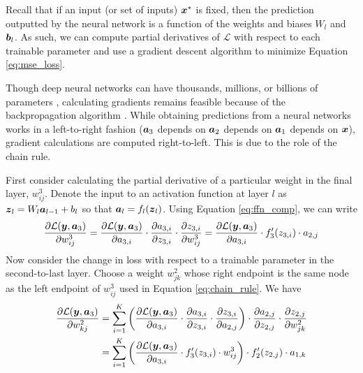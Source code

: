 Recall that if an input (or set of inputs) $\boldsymbol{x}^*$ is fixed, then the prediction outputted by the neural network is a function of the weights and biases $W_l$ and $\boldsymbol{b}_l$. As such, we can compute partial derivatives of $\mathcal{L}$ with respect to each trainable parameter and use a gradient descent algorithm to minimize Equation \ref{eq:mse_loss}.

Though deep neural networks can have thousands, millions, or billions of parameters \cite{gpt3}, calculating gradients remains feasible because of the backpropagation algorithm \cite{rojas1996}. While obtaining predictions from a neural networks works in a left-to-right fashion ($\boldsymbol{a}_3$ depends on $\boldsymbol{a}_2$ depends on $\boldsymbol{a}_1$ depends on $\boldsymbol{x}$), gradient calculations are computed right-to-left. This is due to the role of the chain rule.

First consider calculating the partial derivative of a particular weight in the final layer, $w_{ij}^3$. Denote the input to an activation function at layer $l$ as $\boldsymbol{z}_l = W_l \boldsymbol{a}_{l-1} + b_l$ so that $\boldsymbol{a}_l = f_l(\boldsymbol{z}_l)$. Using Equation \ref{eq:ffn_comp}, we can write
\begin{equation}
\frac{\partial \mathcal{L}(\boldsymbol{y}, \boldsymbol{a}_3)}{\partial w_{ij}^3} = \frac{\partial \mathcal{L}(\boldsymbol{y}, \boldsymbol{a}_3)}{\partial a_{3,i}} \cdot \frac{\partial a_{3,i}}{\partial z_{3,i}} \cdot \frac{\partial z_{3,i}}{\partial w_{ij}^3} = \frac{\partial \mathcal{L}(\boldsymbol{y}, \boldsymbol{a}_3)}{\partial a_{3,i}} \cdot f_3'(z_{3,i}) \cdot a_{2,j} 
  \label{eq:chain_rule}
\end{equation}
Now consider the change in loss with respect to a trainable parameter in the second-to-last layer. Choose a weight $w_{jk}^2$ whose right endpoint is the same node as the left endpoint of $w_{ij}^3$ used in Equation \ref{eq:chain_rule}. We have
\begin{equation}
  \begin{split}
    \frac{\partial \mathcal{L}(\boldsymbol{y}, \boldsymbol{a}_3)}{\partial w_{kj}^2} &= \sum_{i=1}^K \left(\frac{\partial \mathcal{L}(\boldsymbol{y}, \boldsymbol{a}_3)}{\partial a_{3,i}} \cdot \frac{\partial a_{3,i}}{\partial z_{3,i}} \cdot \frac{\partial z_{3,i}}{\partial a_{2,j}}\right) \cdot \frac{\partial a_{2,j}}{\partial z_{2,j}} \cdot \frac{\partial z_{2,j}}{\partial w_{jk}^2} \\
    &= \sum_{i=1}^K \left(\frac{\partial \mathcal{L}(\boldsymbol{y}, \boldsymbol{a}_3)}{\partial a_{3,i}} \cdot f_3'(z_{3,i}) \cdot w_{ij}^3 \right) \cdot f_2'(z_{2,j}) \cdot a_{1,k}
\end{split}
  \label{eq:chain_rule2}
\end{equation}

